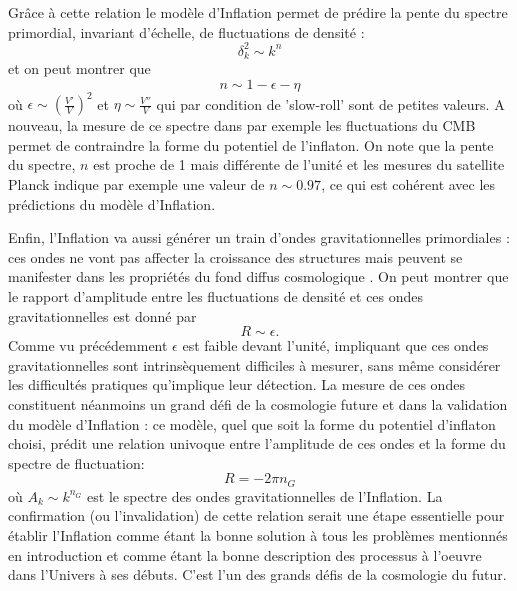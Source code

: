 Grâce à cette relation le modèle d'Inflation permet de prédire la pente du spectre primordial, invariant d'échelle, de fluctuations de densité :
\begin{equation}
\delta^2_k\sim k^n
\end{equation}
et on peut montrer que 
\begin{equation}
n\sim 1-\epsilon -\eta
\end{equation}
où $\epsilon\sim (\frac{V'}{V})^2$ et $\eta \sim \frac{V''}{V}$ qui par condition de 'slow-roll' sont de petites valeurs. A nouveau, la mesure de ce spectre dans par exemple les fluctuations du CMB permet de contraindre la forme du potentiel de l'inflaton. On note que la pente du spectre, $n$ est proche de 1 mais différente de l'unité et les mesures du satellite Planck indique par exemple une valeur de $n\sim 0.97$, ce qui est cohérent avec les prédictions du modèle d'Inflation.

Enfin, l'Inflation va aussi générer un train d'ondes gravitationnelles primordiales : ces ondes ne vont pas affecter la croissance des structures mais peuvent se manifester dans les propriétés du fond diffus cosmologique .
On peut montrer que le rapport d'amplitude entre les fluctuations de densité et ces ondes gravitationnelles est donné par
\begin{equation}
R\sim \epsilon.
\end{equation}
Comme vu précédemment $\epsilon$ est faible devant l'unité, impliquant que ces ondes gravitationnelles sont intrinsèquement difficiles à mesurer, sans même considérer les difficultés pratiques qu'implique leur détection. La mesure de ces ondes constituent néanmoins un grand défi de la cosmologie future et dans la validation du modèle d'Inflation : ce modèle, quel que soit la forme du potentiel d'inflaton choisi, prédit une relation univoque entre l'amplitude de ces ondes et la forme du spectre de fluctuation:
\begin{equation}
R=-2\pi n_G
\end{equation}
où $A_k\sim k^{n_G}$ est le spectre des ondes gravitationnelles de l'Inflation. La confirmation (ou l'invalidation) de cette relation serait une étape essentielle pour établir l'Inflation comme étant la bonne solution à tous les problèmes mentionnés en introduction et comme étant la bonne description des processus à l'oeuvre dans l'Univers à ses débuts. C'est l'un des grands défis de la cosmologie du futur.